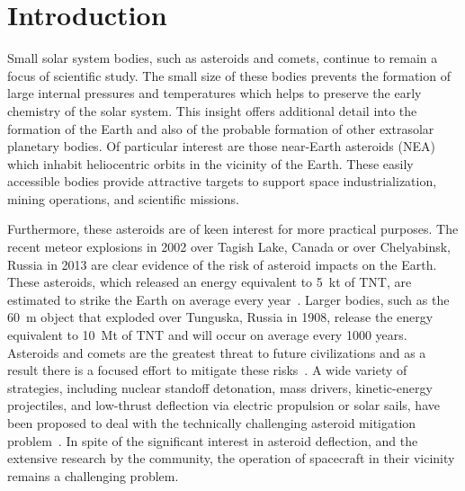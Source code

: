 
\chapter{Introduction}
Small solar system bodies, such as asteroids and comets, continue to remain a focus of scientific study.
The small size of these bodies prevents the formation of large internal pressures and temperatures which helps to preserve the early chemistry of the solar system.
This insight offers additional detail into the formation of the Earth and also of the probable formation of other extrasolar planetary bodies.
Of particular interest are those near-Earth asteroids (NEA) which inhabit heliocentric orbits in the vicinity of the Earth. 
These easily accessible bodies provide attractive targets to support space industrialization, mining operations, and scientific missions.

Furthermore, these asteroids are of keen interest for more practical purposes.
The recent meteor explosions in 2002 over Tagish Lake, Canada or over Chelyabinsk, Russia in 2013 are clear evidence of the risk of asteroid impacts on the Earth.
These asteroids, which released an energy equivalent to \SI{5}{\kilo\tonne} of TNT, are estimated to strike the Earth on average every year~\cite{brown2002}.
Larger bodies, such as the \SI{60}{\meter} object that exploded over Tunguska, Russia in 1908, release the energy equivalent to \SI{10}{\mega\tonne} of TNT and will occur on average every \num{1000} years.
Asteroids and comets are the greatest threat to future civilizations and as a result there is a focused effort to mitigate these risks~\cite{wie2008}.
A wide variety of strategies, including nuclear standoff detonation, mass drivers, kinetic-energy projectiles, and low-thrust deflection via electric propulsion or solar sails, have been proposed to deal with the technically challenging asteroid mitigation problem~\cite{adams2004}.
In spite of the significant interest in asteroid deflection, and the extensive research by the community, the operation of spacecraft in their vicinity remains a challenging problem.

